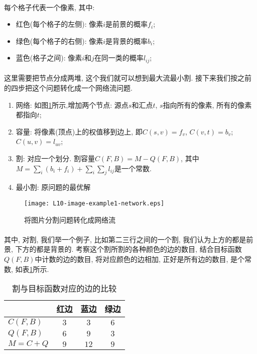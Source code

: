 \documentclass[a4paper]{article}
\renewcommand{\figurename}{图}
\renewcommand{\tablename}{表}
\begin{document}
\paragraph{}每个格子代表一个像素, 其中:
 \begin{itemize}
 \item
  红色(每个格子的左侧): 像素$i$是前景的概率$f_i$;
  \item
   绿色(每个格子的右侧): 像素$i$是背景的概率$b_i$;
   \item
    蓝色(格子之间): 像素$i$和$j$在同一类的概率$l_{ij}$;
     \end{itemize}
        \paragraph{}这里需要把节点分成两堆, 这个我们就可以想到最大流最小割. 接下来我们按之前的四步把这个问题转化成一个网络流问题.
\begin{enumerate}
 \item 网络: 如\figurename\ref{Figure: image_segmentaion_exmaple_networkflow}所示,增加两个节点: 源点$s$和汇点$t$, $s$指向所有的像素, 所有的像素都指向$t$;
 \item 容量: 将像素(顶点)上的权值移到边上, 即$C(s,v)= f_v$, $C(v,t)= b_v$; $C(u,v)=l_{uv}$;
 \item 割: 对应一个划分.  割容量$C(F, B) = M - Q(F, B)$, 其中$M=\sum_i (b_i + f_i) + \sum_i\sum_j l_{ij}$是一个常数.
 \item 最小割: 原问题的最优解
\end{enumerate}
                \begin{figure}[h]
                    \centering
                    \texttt{[image: L10-image-example1-network.eps]}
                    \caption{将图片分割问题转化成网络流}
                    \label{Figure: image_segmentaion_exmaple_networkflow}
                \end{figure}
        \paragraph{}其中, 对割, 我们举一个例子, 比如第二三行之间的一个割, 我们认为上方的都是前景, 下方的都是背景的. 考察这个割所割的各种颜色的边的数目, 结合目标函数$Q(F,B)$中计数的边的数目, 将对应颜色的边相加, 正好是所有边的数目, 是个常数, 如\tablename\ref{Table: image_section_cut_and_objective}所示.
        \begin{table}[h]
        \centering
        \caption{割与目标函数对应的边的比较}
        \label{Table: image_section_cut_and_objective}
        \begin{tabular}{l|ccc}
        \hline
                 & 红边 & 蓝边 & 绿边 \\
        \hline
        $C(F,B)$ & $3$  & $3$  & $6$  \\
        $Q(F,B)$ & $6$  & $9$  & $3$  \\
        \hline
        $M= C+Q$      & $9$  & $12$ & $9$ \\
        \hline
        \end{tabular}
        \end{table}
\end{document}
